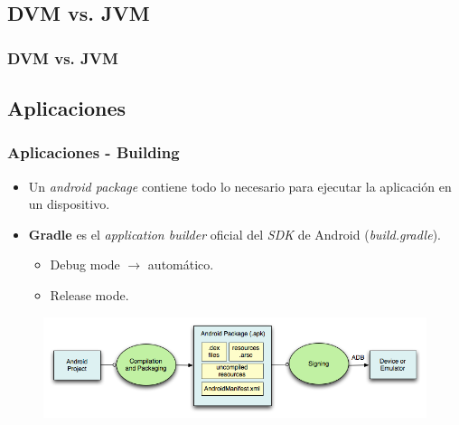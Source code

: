 \subsection{DVM vs. JVM}
\begin{frame}
  \frametitle{DVM vs. JVM}  
  \begin{table}
      \centering
  \end{table}
\end{frame}

\subsection{Aplicaciones}
\begin{frame}
  \frametitle{Aplicaciones - Building}
  \begin{itemize}
    \item Un \textit{android package} contiene todo lo necesario para ejecutar la aplicación en un dispositivo.
    
    \item \textbf{Gradle} es el \textit{application builder} oficial del \textit{SDK} de Android (\textit{build.gradle}).
    \begin{itemize}
  \item Debug mode $\rightarrow$ automático.
  \item Release mode.
    \end{itemize}
  \end{itemize}
  
  \begin{figure}
    \centering
    \includegraphics[scale=0.4]{images/build-app.png}
  \end{figure} 
\end{frame}

